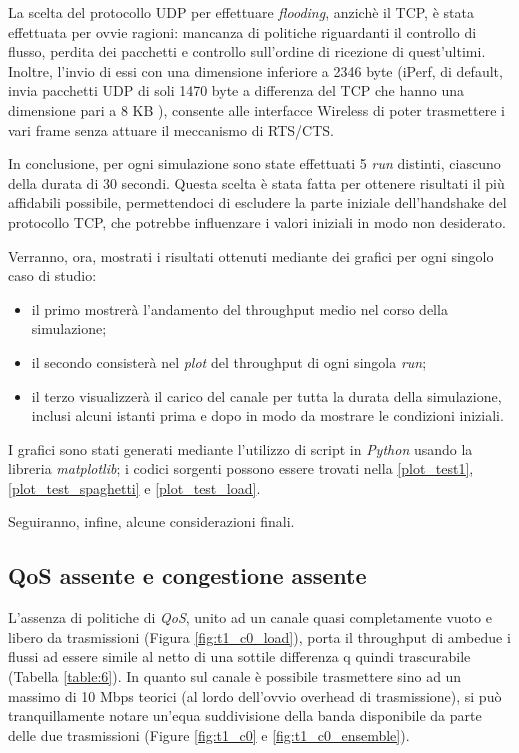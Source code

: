 La scelta del protocollo UDP per effettuare \textit{flooding}, anzichè il TCP, è stata effettuata per ovvie ragioni: mancanza di politiche riguardanti il controllo di flusso, perdita dei pacchetti e controllo sull'ordine di ricezione di quest'ultimi. Inoltre, l'invio di essi con una dimensione inferiore a 2346 byte (iPerf, di default, invia pacchetti UDP di soli 1470 byte a differenza del TCP che hanno una dimensione pari a 8 KB \cite{iperf}), consente alle interfacce Wireless di poter trasmettere i vari frame senza attuare il meccanismo di RTS/CTS.

In conclusione, per ogni simulazione sono state effettuati 5 \textit{run} distinti, ciascuno della durata di 30 secondi. Questa scelta è stata fatta per ottenere risultati il più affidabili possibile, permettendoci di escludere la parte iniziale dell'handshake del protocollo TCP, che potrebbe influenzare i valori iniziali in modo non desiderato.

Verranno, ora, mostrati i risultati ottenuti mediante dei grafici per ogni singolo caso di studio:

\begin{itemize}
    \item il primo mostrerà l'andamento del throughput medio nel corso della simulazione;
    \item il secondo consisterà nel \textit{plot} del throughput di ogni singola \textit{run};
    \item il terzo visualizzerà il carico del canale per tutta la durata della simulazione, inclusi alcuni istanti prima e dopo in modo da mostrare le condizioni iniziali.
\end{itemize}

\noindent I grafici sono stati generati mediante l'utilizzo di script in \textit{Python} usando la libreria \textit{matplotlib}; i codici sorgenti possono essere trovati nella \autoref{plot_test1}, \autoref{plot_test_spaghetti} e \autoref{plot_test_load}.

Seguiranno, infine, alcune considerazioni finali.

\subsection[QoS assente e congestione assente]{QoS assente e congestione assente}
L'assenza di politiche di \textit{QoS}, unito ad un canale quasi completamente vuoto e libero da trasmissioni (Figura \ref{fig:t1_c0_load}), porta il throughput di ambedue i flussi ad essere simile al netto di una sottile differenza q quindi trascurabile (Tabella \ref{table:6}). In quanto sul canale è possibile trasmettere sino ad un massimo di 10 Mbps teorici (al lordo dell'ovvio overhead di trasmissione), si può tranquillamente notare un'equa suddivisione della banda disponibile da parte delle due trasmissioni (Figure \ref{fig:t1_c0} e \ref{fig:t1_c0_ensemble}).

